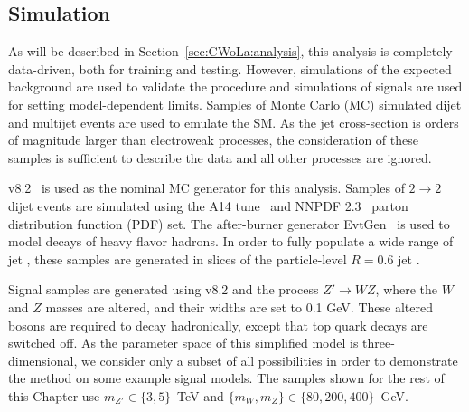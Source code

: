 \subsection{Simulation}

As will be described in Section~\ref{sec:CWoLa:analysis}, this analysis is completely data-driven, both for training and testing.
However, simulations of the expected background are used to validate the procedure and simulations of signals are used for setting model-dependent limits.
Samples of Monte Carlo (MC) simulated dijet and multijet events are used to emulate the SM.
As the jet cross-section is orders of magnitude larger than electroweak processes, the consideration of these samples is sufficient to describe the data and all other processes are ignored.  

\PYTHIA{} v8.2~\cite{Sjostrand:2007gs,Sjostrand:2006za} is used as the nominal MC generator for this analysis.
Samples of $2\rightarrow 2$ dijet events are simulated using the A14 tune~\cite{ATL-PHYS-PUB-2014-021} and NNPDF 2.3~\cite{Ball:2012cx} parton distribution function (PDF) set.
The after-burner generator EvtGen~\cite{Lange:2001uf} is used to model decays of heavy flavor hadrons.
In order to fully populate a wide range of jet \pt, these samples are generated in slices of the particle-level $R=0.6$ jet \pt.

Signal samples are generated using \PYTHIA{} v8.2 and the process $Z'\rightarrow WZ$, where the $W$ and $Z$ masses are altered, and their widths are set to 0.1 GeV.
These altered bosons are required to decay hadronically, except that top quark decays are switched off.
As the parameter space of this simplified model is three-dimensional, we consider only a subset of all possibilities in order to demonstrate the method on some example signal models.
The samples shown for the rest of this Chapter use $m_{Z'}\in\{3,5\}$~TeV and $\{m_W,m_Z\}\in\{80,200,400\}$~GeV.

